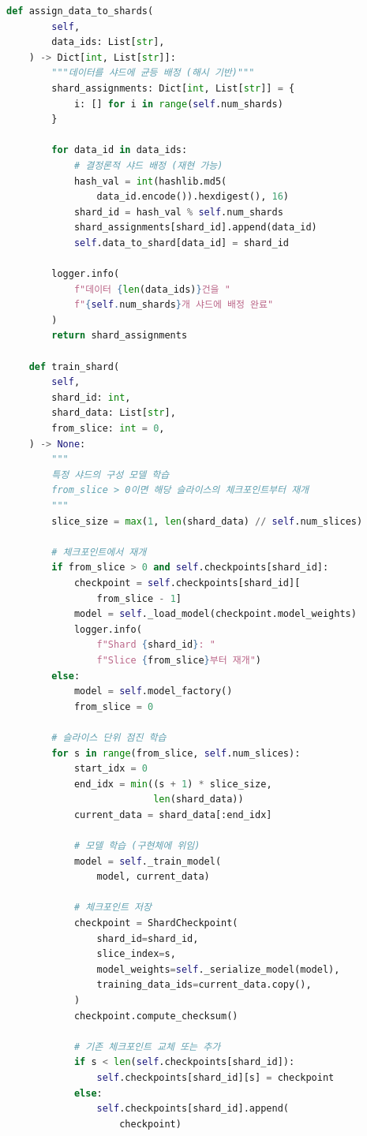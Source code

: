 \begin{lstlisting}[language=Python, caption={SISA 기반 머신 언러닝 구현}, label={lst:sisa_unlearning}]
    def assign_data_to_shards(
        self,
        data_ids: List[str],
    ) -> Dict[int, List[str]]:
        """데이터를 샤드에 균등 배정 (해시 기반)"""
        shard_assignments: Dict[int, List[str]] = {
            i: [] for i in range(self.num_shards)
        }

        for data_id in data_ids:
            # 결정론적 샤드 배정 (재현 가능)
            hash_val = int(hashlib.md5(
                data_id.encode()).hexdigest(), 16)
            shard_id = hash_val % self.num_shards
            shard_assignments[shard_id].append(data_id)
            self.data_to_shard[data_id] = shard_id

        logger.info(
            f"데이터 {len(data_ids)}건을 "
            f"{self.num_shards}개 샤드에 배정 완료"
        )
        return shard_assignments

    def train_shard(
        self,
        shard_id: int,
        shard_data: List[str],
        from_slice: int = 0,
    ) -> None:
        """
        특정 샤드의 구성 모델 학습
        from_slice > 0이면 해당 슬라이스의 체크포인트부터 재개
        """
        slice_size = max(1, len(shard_data) // self.num_slices)

        # 체크포인트에서 재개
        if from_slice > 0 and self.checkpoints[shard_id]:
            checkpoint = self.checkpoints[shard_id][
                from_slice - 1]
            model = self._load_model(checkpoint.model_weights)
            logger.info(
                f"Shard {shard_id}: "
                f"Slice {from_slice}부터 재개")
        else:
            model = self.model_factory()
            from_slice = 0

        # 슬라이스 단위 점진 학습
        for s in range(from_slice, self.num_slices):
            start_idx = 0
            end_idx = min((s + 1) * slice_size,
                          len(shard_data))
            current_data = shard_data[:end_idx]

            # 모델 학습 (구현체에 위임)
            model = self._train_model(
                model, current_data)

            # 체크포인트 저장
            checkpoint = ShardCheckpoint(
                shard_id=shard_id,
                slice_index=s,
                model_weights=self._serialize_model(model),
                training_data_ids=current_data.copy(),
            )
            checkpoint.compute_checksum()

            # 기존 체크포인트 교체 또는 추가
            if s < len(self.checkpoints[shard_id]):
                self.checkpoints[shard_id][s] = checkpoint
            else:
                self.checkpoints[shard_id].append(
                    checkpoint)


\end{lstlisting}
